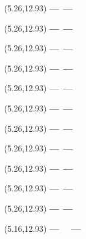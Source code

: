 \documentclass[12pt,a4paper]{article}
\begin{document}
\begin{textblock}{3}(5.26,12.93)
{\bf ---}\quad\quad\ {\bf ---}
\end{textblock}
\newpage

\begin{textblock}{3}(5.26,12.93)
{\bf ---}\quad\quad\ {\bf ---}
\end{textblock}
\newpage

\begin{textblock}{3}(5.26,12.93)
{\bf ---}\quad\quad\ {\bf ---}
\end{textblock}
\newpage

\begin{textblock}{3}(5.26,12.93)
{\bf ---}\quad\quad\ {\bf ---}
\end{textblock}
\newpage

\begin{textblock}{3}(5.26,12.93)
{\bf ---}\quad\quad\ {\bf ---}
\end{textblock}
\newpage

\begin{textblock}{3}(5.26,12.93)
{\bf ---}\quad\quad\ {\bf ---}
\end{textblock}
\newpage

\begin{textblock}{3}(5.26,12.93)
{\bf ---}\quad\quad\ {\bf ---}
\end{textblock}
\newpage

\begin{textblock}{3}(5.26,12.93)
{\bf ---}\quad\quad\ {\bf ---}
\end{textblock}
\newpage

\begin{textblock}{3}(5.26,12.93)
{\bf ---}\quad\quad\ {\bf ---}
\end{textblock}
\newpage

\begin{textblock}{3}(5.26,12.93)
{\bf ---}\quad\quad\ {\bf ---}
\end{textblock}
\newpage

\begin{textblock}{3}(5.26,12.93)
{\bf ---}\quad\quad\ {\bf ---}
\end{textblock}
\newpage

\begin{textblock}{3}(5.16,12.93)
{\bf ---}\quad\quad\ \ \ {\bf ---}
\end{textblock}
\end{document}
